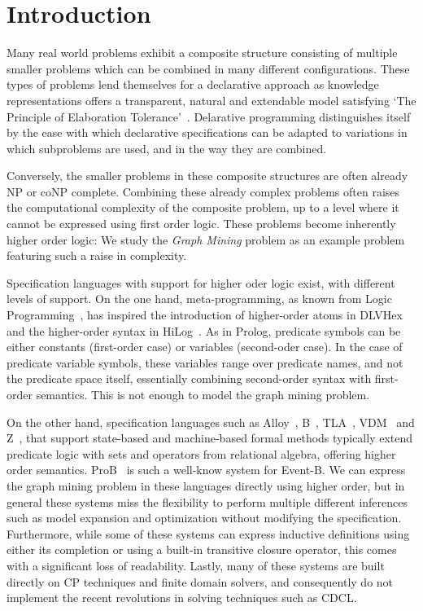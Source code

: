 \section{Introduction}
Many real world problems exhibit a composite structure consisting of multiple smaller problems which can be combined in many different configurations.
These types of problems lend themselves for a declarative approach as knowledge representations offers a transparent, natural and extendable model satisfying `The Principle of Elaboration Tolerance'~\citep{elaboration_tolerance}.
Delarative programming distinguishes itself by the ease with which declarative specifications can be adapted to variations in which subproblems are used, and in the way they are combined.

Conversely, the smaller problems in these composite structures are often already NP or coNP complete.
Combining these already complex problems often raises the computational complexity of the composite problem, up to a level where it cannot be expressed using first order logic.
These problems become inherently higher order logic: We study the \emph{Graph Mining} problem as an example problem featuring such a raise in complexity.

Specification languages with support for higher oder logic exist, with different levels of support.
On the one hand, meta-programming, as known from Logic Programming~\citep{Abramson and Rogers 1989}, has inspired the introduction of higher-order atoms in DLVHex~\citep{?}  and the higher-order syntax in HiLog~\citep{?}.
As in Prolog, predicate symbols can be either constants (first-order case) or variables (second-oder case).
In the case of predicate variable symbols, these variables range over predicate names, and not the predicate space itself, essentially combining second-order syntax with first-order semantics. 
This is not enough to model the graph mining problem.

On the other hand, specification languages such as Alloy~\citep{?}, B~\citep{?}, TLA~\citep{?}, VDM~\citep{?} and Z~\citep{?}, that support state-based and machine-based formal methods typically extend predicate logic with sets and operators from relational algebra, offering higher order semantics.
ProB~\citep{?} is such a well-know system for Event-B.
We can express the graph mining problem in these languages directly using higher order, but in general these systems miss the flexibility to perform multiple different inferences such as model expansion and optimization without modifying the specification.
Furthermore, while some of these systems can express inductive definitions using either its completion or using a built-in transitive closure operator, this comes with a significant loss of readability.
Lastly, many of these systems are built directly on CP techniques and finite domain solvers, and consequently do not implement the recent revolutions in solving techniques such as CDCL.

